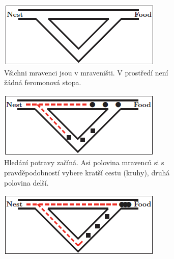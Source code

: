 \documentclass[a4paper,12pt]{article}
\begin{document}
\begin{figure}[here]
  \centering
    \begin{subfigure}[t]{0.45\textwidth}
      \centering
      \includegraphics[width=\textwidth]{img/aco_a}
      \caption{Všichni mravenci jsou v mraveništi. V prostředí není žádná feromonová stopa.}
      \label{fig:aco_a}
    \end{subfigure}\quad%
    \begin{subfigure}[t]{0.45\textwidth}
      \centering
      \includegraphics[width=\textwidth]{img/aco_b}
      \caption{Hledání potravy začíná. Asi polovina mravenců si s pravděpodobností vybere kratší cestu (kruhy), 
               druhá polovina delší.}
      \label{fig:aco_b}
    \end{subfigure}
    \begin{subfigure}[t]{0.45\textwidth}
      \centering
      \includegraphics[width=\textwidth]{img/aco_c}

\end{subfigure}
\end{figure}
\end{document}
